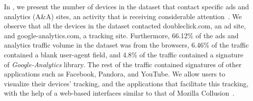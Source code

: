 In , we present the number of devices in the \mobWild dataset that contact specific ads and analytics (A\&A) sites, an activity that is receiving considerable attention~\cite{roesner:webtrackers,leontiadis:mobileads,vallina-rod:ads}.
We observe that all the devices in the \mobWild dataset contacted doubleclick.com, an ad site, and google-analytics.com, a tracking site. 
Furthermore, 66.12\% of the ads and analytics traffic volume in the \mobWild dataset was from the browsers, 6.46\% of the
traffic contained a blank user-agent field, and 4.8\% of the traffic contained a signature of \emph{Google-Analytics} library.
The rest of the traffic contained signatures of other applications such as Facebook, Pandora, and YouTube.
We allow users to visualize their devices' tracking, and the applications that facilitate this tracking, with the help of a web-based interfaces similar to that of Mozilla Collusion~\cite{collusion}.








